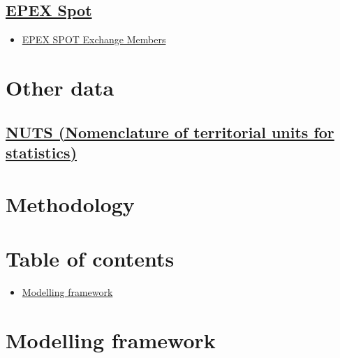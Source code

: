 \hypertarget{epex-spot}{%
\subsection{\texorpdfstring{\href{https://www.epexspot.com/en/extras/download-center/market_data}{EPEX
Spot}}{EPEX Spot}}\label{epex-spot}}

\begin{itemize}
\tightlist
\item
  \href{https://www.epexspot.com/en/membership/list_of_members}{EPEX
  SPOT Exchange Members}
\end{itemize}

\hypertarget{other-data}{%
\section{Other data}\label{other-data}}

\hypertarget{nuts-nomenclature-of-territorial-units-for-statistics-}{%
\subsection{\texorpdfstring{\href{https://ec.europa.eu/eurostat/web/gisco/geodata/reference-data/administrative-units-statistical-units/nuts}{NUTS
(Nomenclature of territorial units for
statistics)}}{NUTS (Nomenclature of territorial units for statistics)}}\label{nuts-nomenclature-of-territorial-units-for-statistics-}}

\hypertarget{methodology}{%
\section{Methodology}\label{methodology}}

\hypertarget{table-of-contents-omit-in-toc-}{%
\section{Table of contents}\label{table-of-contents-omit-in-toc-}}

\begin{itemize}
\tightlist
\item
  \protect\hyperlink{modelling-framework}{Modelling framework}
\end{itemize}

\hypertarget{modelling-framework}{%
\section{Modelling framework}\label{modelling-framework}}

